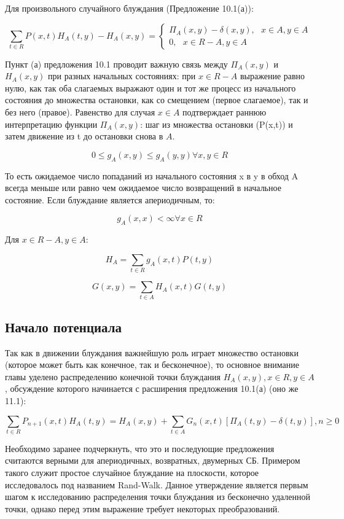 Для произвольного случайного блуждания (Предложение 10.1(а)):

\begin{equation}
 \sum_{t \in R} P(x,t)H_A(t,y) - H_A(x,y) =  \begin{cases}
							\Pi_A(x,y)-\delta(x,y),\ \ \ x \in A, y\in A \\
							0,\ \ \ x \in R- A, y \in A
						        \end{cases}
\end{equation}

Пункт (а) предложения 10.1 проводит важную связь между $\Pi_A(x,y)$ и $H_A(x,y)$ при разных начальных состояниях: при $x \in R-A$ выражение равно нулю, как так оба слагаемых выражают один и тот же процесс из начального состояния до множества остановки, как со смещением (первое слагаемое), так и без него (правое). Равенство для случая $x \in A$ подтверждает раннюю интерпретацию функции $\Pi_A(x,y)$: шаг из множества остановки (P(x,t)) и затем движение из t до остановки снова в $A$.

\[ 0 \leq g_A(x,y) \leq g_A(y,y) \forall x, y \in R \]

То есть ожидаемое число попаданий из начального состояния x в y в обход A всегда меньше или равно чем ожидаемое число возвращений в начальное состояние. 
Если блуждание является апериодичным, то:

\[ g_A(x,x) < \infty \forall x \in R \]

Для $x \in R-A, y \in A$:

\[ H_A = \sum_{t \in R} g_A(x,t)P(t,y)\]

\[  G(x,y) = \sum_{t \in A} H_A(x,t)G(t,y) \]

\subsection{Начало потенциала}

Так как в движении блуждания важнейшую роль играет множество остановки (которое может быть как конечное, так и бесконечное), то основное внимание главы 
уделено распределению конечной точки блуждания $H_A(x,y), x \in R, y \in A$, обсуждение которого начинается с расширения предложения 10.1(а) (оно же 11.1):

\begin{equation}
 \sum_{t \in R} P_{n+1}(x,t)H_A(t,y) = H_A(x,y) + \sum_{t \in A} G_n(x,t)[\Pi_A(t,y)-\delta(t,y)], n \geq 0
\end{equation}

Необходимо заранее подчеркнуть, что это и последующие предложения считаются верными для апериодичных, возвратных, двумерных СБ. Примером такого служит простое
случайное блуждание на плоскости, которое исследовалось под названием Rand-Walk. 
Данное утверждение является первым шагом к исследованию распределения точки блуждания из бесконечно удаленной точки, однако перед этим выражение требует 
некоторых преобразований.

